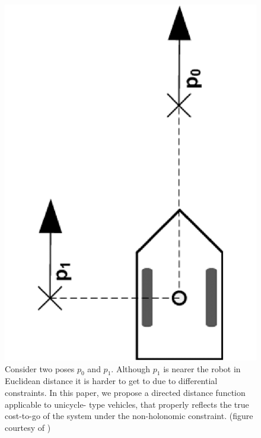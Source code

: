 \begin{figure}
  \centering
  \includegraphics[scale=.2,angle=-90]{figures/rrtfunnel/non-holonomic-vehicle-euclidean-weakness}
  \caption{Consider two poses \(p_0\) and \(p_1\). Although \(p_1\) is nearer
    the robot in Euclidean distance it is harder to get to due to differential
    constraints. In this paper, we propose a directed distance function
    applicable to unicycle- type vehicles, that properly reflects the true
    cost-to-go of the system under the non-holonomic constraint. (figure
    courtesy of \cite{parkFeedbackMotionPlanning2015})}
  \label{fig:non-holonomic-vehicle-euclidean-weakness}
\end{figure}

\begin{figure}
  
\end{figure}


